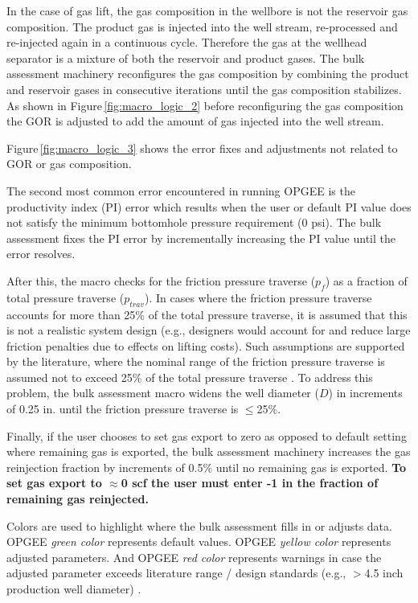 \documentclass[11pt]{report}
\begin{document}
In the case of gas lift, the gas composition in the wellbore is not the reservoir gas composition. The product gas is injected into the well stream, re-processed and re-injected again in a continuous cycle. Therefore the gas at the wellhead separator is a mixture of both the reservoir and product gases. The bulk assessment machinery reconfigures the gas composition by combining the product and reservoir gases in consecutive iterations until the gas composition stabilizes. As shown in Figure\,\ref{fig:macro_logic_2} before reconfiguring the gas composition the GOR is adjusted to add the amount of gas injected into the well stream.\par

Figure\,\ref{fig:macro_logic_3} shows the error fixes and adjustments not related to GOR or gas composition. 

The second most common error encountered in running OPGEE is the productivity index (PI) error which results when the user or default PI value does not satisfy the minimum bottomhole pressure requirement (0 psi). The bulk assessment fixes the PI error by incrementally increasing the PI value until the error resolves. 

After this, the macro checks for the friction pressure traverse ($p_f$) as a fraction of total pressure traverse ($p_{trav}$). In cases where the friction pressure traverse accounts for more than 25\% of the total pressure traverse, it is assumed that this is not a realistic system design (e.g., designers would account for and reduce large friction penalties due to effects on lifting costs). Such assumptions are supported by the literature, where the nominal range of the friction pressure traverse is assumed not to exceed 25\% of the total pressure traverse \cite{Takacs2005}. To address this problem, the bulk assessment macro widens the well diameter ($D$) in increments of 0.25 in. until the friction pressure traverse is $\leq$25\%. 

Finally, if the user chooses to set gas export to zero as opposed to default setting where remaining gas is exported, the bulk assessment machinery increases the gas reinjection fraction by increments of 0.5\% until no remaining gas is exported. \textbf{To set gas export to $\approx$0 scf the user must enter -1 in the fraction of remaining gas reinjected.} \par

Colors are used to highlight where the bulk assessment fills in or adjusts data. OPGEE \textit{green color} represents default values. OPGEE \textit{yellow color} represents adjusted parameters. And OPGEE \textit{red color} represents warnings in case the adjusted parameter exceeds literature range / design standards (e.g., $>$4.5 inch production well diameter) \cite[p. 106]{Clegg2007}.
\end{document}

